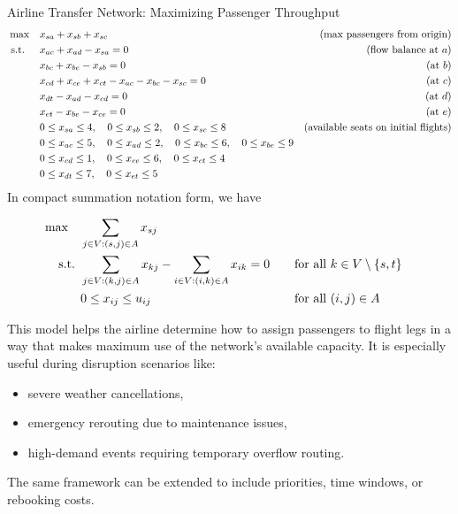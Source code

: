 \begin{examplewithallcode}{Airline Transfer Network: Maximizing Passenger Throughput}
\smallskip {}
\begin{align*}
\max \quad & x_{sa} + x_{sb} + x_{sc} & \text{(max passengers from origin)} \\
\text{ s.t. } \quad 
& x_{ac} + x_{ad} - x_{sa} = 0 & \text{(flow balance at \( a \))} \\
& x_{bc} + x_{be} - x_{sb} = 0 & \text{(at \( b \))} \\
& x_{cd} + x_{ce} + x_{ct} - x_{ac} - x_{bc} - x_{sc} = 0 & \text{(at \( c \))} \\
& x_{dt} - x_{ad} - x_{cd} = 0 & \text{(at \( d \))} \\
& x_{et} - x_{be} - x_{ce} = 0 & \text{(at \( e \))} \\
& 0 \leq x_{sa} \leq 4,\quad 0 \leq x_{sb} \leq 2,\quad 0 \leq x_{sc} \leq 8 & \text{(available seats on initial flights)} \\
& 0 \leq x_{ac} \leq 5,\quad 0 \leq x_{ad} \leq 2,\quad 0 \leq x_{bc} \leq 6,\quad 0 \leq x_{be} \leq 9 \\
& 0 \leq x_{cd} \leq 1,\quad 0 \leq x_{ce} \leq 6,\quad 0 \leq x_{ct} \leq 4 \\
& 0 \leq x_{dt} \leq 7,\quad 0 \leq x_{et} \leq 5
\end{align*}
In compact summation notation form,  we have

$$
\begin{aligned}
\max \quad & \sum_{j \in V : (s,j) \in A} x_{sj} \\
\text{ s.t. }        & \sum_{j \in V : (k,j) \in A} x_{kj} - \sum_{i \in V : (i,k) \in A} x_{ik} = 0 &&\quad \text{for all } k \in V \setminus \{s,t\} \\
           & 0 \leq x_{ij} \leq u_{ij} &&\quad \text{for all } (i,j) \in A
\end{aligned}
$$

\vspace{0.5em}
\noindent This model helps the airline determine how to assign passengers to flight legs in a way that makes maximum use of the network’s available capacity. It is especially useful during disruption scenarios like:
\begin{itemize}
    \item severe weather cancellations,
    \item emergency rerouting due to maintenance issues,
    \item high-demand events requiring temporary overflow routing.
\end{itemize}

The same framework can be extended to include priorities, time windows, or rebooking costs.
\end{examplewithallcode}

